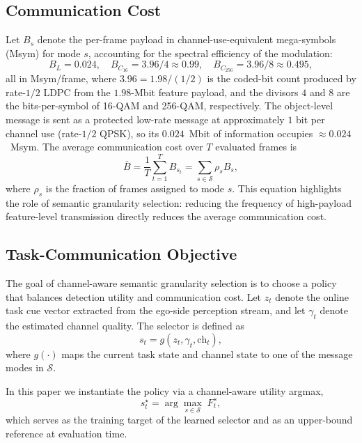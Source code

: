 \documentclass[journal]{IEEEtran}
\begin{document}
\subsection{Communication Cost}

Let $B_s$ denote the per-frame payload in channel-use-equivalent mega-symbols (Msym) for mode $s$, accounting for the spectral efficiency of the modulation:
\begin{equation}
B_L = 0.024, \quad B_{C_{16}} = 3.96/4 \approx 0.99, \quad B_{C_{256}} = 3.96/8 \approx 0.495,
\label{eq:payload}
\end{equation}
all in Msym/frame, where $3.96 = 1.98/(1/2)$ is the coded-bit count produced by rate-$1/2$ LDPC from the $1.98$-Mbit feature payload, and the divisors $4$ and $8$ are the bits-per-symbol of 16-QAM and 256-QAM, respectively. The object-level message is sent as a protected low-rate message at approximately $1$ bit per channel use (rate-$1/2$ QPSK), so its $0.024$~Mbit of information occupies ${\approx}0.024$~Msym. The average communication cost over $T$ evaluated frames is
\begin{equation}
\bar{B} = \frac{1}{T}\sum_{t=1}^{T} B_{s_t} = \sum_{s \in \mathcal{S}} \rho_s B_s,
\end{equation}
where $\rho_s$ is the fraction of frames assigned to mode $s$. This equation highlights the role of semantic granularity selection: reducing the frequency of high-payload feature-level transmission directly reduces the average communication cost.

\subsection{Task-Communication Objective}

The goal of channel-aware semantic granularity selection is to choose a policy that balances detection utility and communication cost. Let $z_t$ denote the online task cue vector extracted from the ego-side perception stream, and let $\gamma_t$ denote the estimated channel quality. The selector is defined as
\begin{equation}
s_t = g(z_t, \gamma_t, \text{ch}_t),
\label{eq:selector}
\end{equation}
where $g(\cdot)$ maps the current task state and channel state to one of the message modes in $\mathcal{S}$.

In this paper we instantiate the policy via a channel-aware utility argmax,
\begin{equation}
s_t^\star = \arg\max_{s \in \mathcal{S}}\; F_t^{s},
\label{eq:oracle}
\end{equation}
which serves as the training target of the learned selector and as an upper-bound reference at evaluation time.
\end{document}

